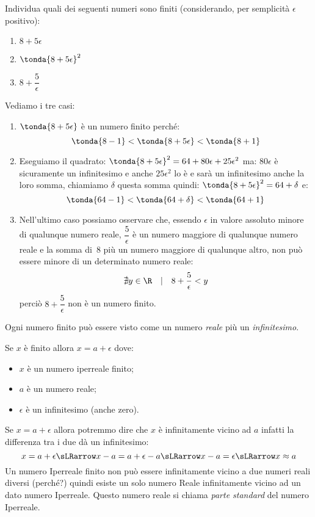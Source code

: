 \begin{esempio}
 Individua quali dei seguenti numeri sono finiti (considerando, per 
semplicità \(\epsilon\) positivo):

\begin{multicols}{3}
\begin{enumerate}
 \item \(8+5\epsilon\)
 \item \(\tonda{8+5\epsilon}^2\)
 \item \(8+\dfrac{5}{\epsilon}\)
\end{enumerate}
\end{multicols}

Vediamo i tre casi:

\begin{enumerate}
 \item \(\tonda{8+5\epsilon}\) è un numero finito perché:
 \[\tonda{8-1} < \tonda{8+5\epsilon} < \tonda{8+1}\]
 \item Eseguiamo il quadrato:
 \(\tonda{8+5\epsilon}^2 = 64 +80 \epsilon +25 \epsilon^2\)
 ma: \(80 \epsilon\) è sicuramente un infinitesimo e anche \(25 \epsilon^2\)
 lo è e sarà un infinitesimo anche la loro somma, chiamiamo \(\delta\) 
questa somma quindi: 
\(\tonda{8+5\epsilon}^2 = 64 + \delta\)
e: 
\[\tonda{64 -1} < \tonda{64 + \delta} < \tonda{64 +1}\]
 \item Nell'ultimo caso possiamo osservare che, essendo \(\epsilon\) in 
valore assoluto minore di qualunque numero reale, 
 \(\dfrac{5}{\epsilon}\) è un numero maggiore di qualunque numero reale e 
la somma di~8 più un numero maggiore di qualunque altro, non può essere 
minore di un determinato numero reale:
 \[\nexists y \in \R \quad | \quad 8+\dfrac{5}{\epsilon} < y\]
perciò \(8+\dfrac{5}{\epsilon}\) non è un numero finito.
\end{enumerate}
\end{esempio}

\noindent Ogni numero finito può essere visto come un numero \emph{reale} 
più un \emph{infinitesimo}.

Se \(x\) è finito allora \(x = a + \epsilon\) dove:
\begin{itemize} [noitemsep]
 \item \(x\) è un numero iperreale finito;
 \item \(a\) è un numero reale;
 \item \(\epsilon\) è un infinitesimo (anche zero).
\end{itemize}

Se \(x=a+\epsilon\) allora potremmo dire che \(x\) è infinitamente vicino 
ad \(a\) infatti la differenza tra i due dà un infinitesimo: 
\[x=a+\epsilon \sLRarrow
x-a = a+\epsilon-a \sLRarrow x-a = \epsilon \sLRarrow x \approx a\]
Un numero Iperreale finito non può essere infinitamente vicino 
a due numeri reali diversi (perché?) quindi esiste un solo numero Reale 
infinitamente vicino ad un dato numero Iperreale. 
Questo numero reale si chiama \emph{parte standard} del numero Iperreale.

